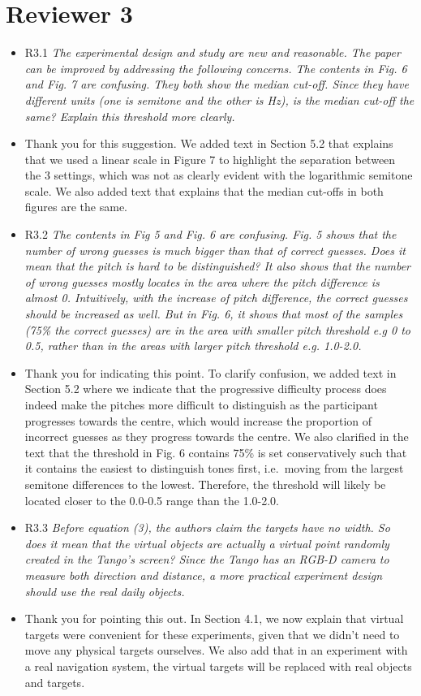 \documentclass{scrartcl}
\begin{document}
\section*{Reviewer 3}

\begin{itemize}
  \item R3.1 \textit{The experimental design and study are new and reasonable. The paper can be improved by addressing the following concerns. The contents in Fig. 6 and Fig. 7 are confusing. They both show the median cut-off. Since they have different units (one is semitone and the other is Hz), is the median cut-off the same? Explain this threshold more clearly.}
  \item[] Thank you for this suggestion.
    We added text in Section 5.2 that explains that we used a linear scale in Figure 7 to highlight the separation between the 3 settings, which was not as clearly evident with the logarithmic semitone scale.
    We also added text that explains that the median cut-offs in both figures are the same.

  \item R3.2 \textit{The contents in Fig 5 and Fig. 6 are confusing. Fig. 5 shows that the number of wrong guesses is much bigger than that of correct guesses. Does it mean that the pitch is hard to be distinguished? It also shows that the number of wrong guesses mostly locates in the area where the pitch difference is almost 0. Intuitively, with the increase of pitch difference, the correct guesses should be increased as well. But in Fig. 6, it shows that most of the samples (75\% the correct guesses) are in the area with smaller pitch threshold e.g 0 to 0.5, rather than in the areas with larger pitch threshold e.g. 1.0-2.0.}
  \item[] Thank you for indicating this point.
    To clarify confusion, we added text in Section 5.2 where we indicate that the progressive difficulty process does indeed make the pitches more difficult to distinguish as the participant progresses towards the centre, which would increase the proportion of incorrect guesses as they progress towards the centre.
    We also clarified in the text that the threshold in Fig. 6 contains 75\% is set conservatively such that it contains the easiest to distinguish tones first, i.e.\ moving from the largest semitone differences to the lowest.
    Therefore, the threshold will likely be located closer to the 0.0-0.5 range than the 1.0-2.0. 

  \item R3.3 \textit{Before equation (3), the authors claim the targets have no width. So does it mean that the virtual objects are actually a virtual point randomly created in the Tango’s screen? Since the Tango has an RGB-D camera to measure both direction and distance, a more practical experiment design should use the real daily objects.}
  \item[] Thank you for pointing this out.
    In Section 4.1, we now explain that virtual targets were convenient for these experiments, given that we didn't need to move any physical targets ourselves.
    We also add that in an experiment with a real navigation system, the virtual targets will be replaced with real objects and targets.


\end{itemize}
\end{document}
